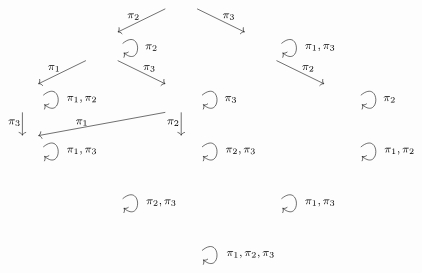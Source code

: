 \documentclass[12pt, reqno]{amsart}
\theoremstyle{definition}
\numberwithin{equation}{section} \numberwithin{figure}{section}
\numberwithin{table}{section}
\begin{document}
\begin{figure}[t]
\[\begin{tikzpicture}
\node at (-1*\hp + 0.2*\hp, -1*\vp) {} edge [out=40,in=320, loop] ();
\node at (-1*\hp + 0.625*\hp, -1*\vp) {\footnotesize $\pi_2$};
\node at (1*\hp + 0.2*\hp, -1*\vp) {} edge [out=40,in=320, loop] ();
\node at (1*\hp + 0.75*\hp, -1*\vp) {\footnotesize $\pi_1, \pi_3$};


\node at (-2*\hp + 0.2*\hp, -2*\vp) {} edge [out=40,in=320, loop] ();
\node at (-2*\hp + 0.75*\hp, -2*\vp) {\footnotesize $\pi_1, \pi_2$};
\node at (0*\hp + 0.2*\hp, -2*\vp) {} edge [out=40,in=320, loop] ();
\node at (0*\hp + 0.625*\hp, -2*\vp) {\footnotesize $\pi_3$};
\node at (2*\hp + 0.2*\hp, -2*\vp) {} edge [out=40,in=320, loop] ();
\node at (2*\hp + 0.625*\hp, -2*\vp) {\footnotesize $\pi_2$};


\node at (-2*\hp + 0.2*\hp, -3*\vp) {} edge [out=40,in=320, loop] ();
\node at (-2*\hp + 0.75*\hp, -3*\vp) {\footnotesize $\pi_1, \pi_3$};
\node at (0*\hp + 0.2*\hp, -3*\vp) {} edge [out=40,in=320, loop] ();
\node at (0*\hp + 0.75*\hp, -3*\vp) {\footnotesize $\pi_2, \pi_3$};
\node at (2*\hp + 0.2*\hp, -3*\vp) {} edge [out=40,in=320, loop] ();
\node at (2*\hp + 0.75*\hp, -3*\vp) {\footnotesize $\pi_1, \pi_2$};

\node at (-1*\hp + 0.2*\hp, -4*\vp) {} edge [out=40,in=320, loop] ();
\node at (-1*\hp + 0.75*\hp, -4*\vp) {\footnotesize $\pi_2, \pi_3$};
\node at (1*\hp + 0.2*\hp, -4*\vp) {} edge [out=40,in=320, loop] ();
\node at (1*\hp + 0.75*\hp, -4*\vp) {\footnotesize $\pi_1, \pi_3$};

\node at (0*\hp + 0.2*\hp, -5*\vp) {} edge [out=40,in=320, loop] ();
\node at (0*\hp + 0.875*\hp, -5*\vp) {\footnotesize $\pi_1, \pi_2, \pi_3$};


\draw[->] (-0.2*\hp, -0.25*\vp) -- (-0.8*\hp, -0.7*\vp);
\node at (-0.6*\hp, -0.4*\vp) {\footnotesize $\pi_2$};
\draw[->] (0.2*\hp, -0.25*\vp) -- (0.8*\hp, -0.7*\vp);
\node at (0.6*\hp, -0.4*\vp) {\footnotesize $\pi_3$};

\draw[->] (-1.2*\hp, -1.25*\vp) -- (-1.8*\hp, -1.7*\vp);
\node at (-1.6*\hp, -1.4*\vp) {\footnotesize $\pi_1$};
\draw[->] (-0.8*\hp, -1.25*\vp) -- (-0.2*\hp, -1.7*\vp);
\node at (-0.4*\hp, -1.4*\vp) {\footnotesize $\pi_3$};


\draw[->] (1.2*\hp, -1.25*\vp) -- (1.8*\hp, -1.7*\vp);
\node at (1.6*\hp, -1.4*\vp) {\footnotesize $\pi_2$};
\draw[->] (-2*\hp, -2.25*\vp) -- (-2*\hp, -2.7*\vp);
\node at (-2.1*\hp, -2.45*\vp) {\footnotesize $\pi_3$};

\draw[->] (-0.2*\hp, -2.25*\vp) -- (-1.8*\hp, -2.7*\vp);
\node at (-1.25*\hp, -2.45*\vp) {\footnotesize $\pi_1$};
\draw[->] (0*\hp, -2.25*\vp) -- (0*\hp, -2.7*\vp);
\node at (-0.1*\hp, -2.45*\vp) {\footnotesize $\pi_2$};


\end{tikzpicture}\]
\end{figure}
\end{document}
